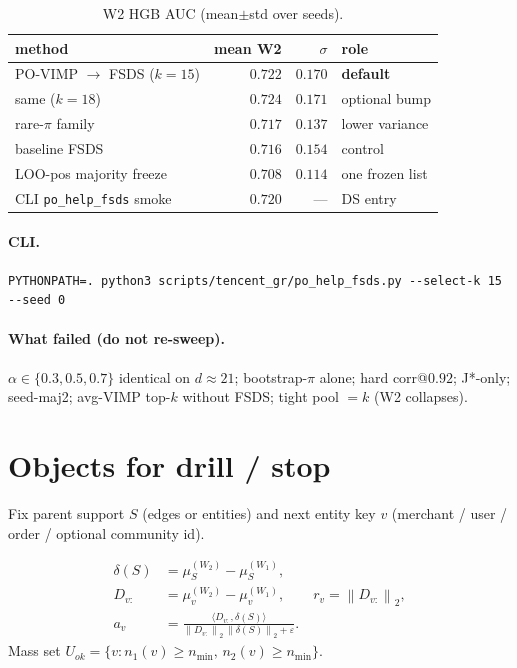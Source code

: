 \documentclass[11pt]{article}
\newcommand{\norm}[1]{\left\|#1\right\|_2}
\begin{document}
\begin{table}[h]
\centering
\caption{W2 HGB AUC (mean$\pm$std over seeds).}
\label{tab:fsds-head}
\begin{tabular}{lrrl}
\toprule
method & mean W2 & $\sigma$ & role \\
\midrule
PO-VIMP $\to$ FSDS ($k{=}15$) & $\mathbf{0.722}$ & $0.170$ & \textbf{default} \\
same ($k{=}18$) & $0.724$ & $0.171$ & optional bump \\
rare-$\pi$ family & $0.717$ & $\mathbf{0.137}$ & lower variance \\
baseline FSDS & $0.716$ & $0.154$ & control \\
LOO-pos majority freeze & $0.708$ & $0.114$ & one frozen list \\
CLI \texttt{po\_help\_fsds} smoke & $0.720$ & --- & DS entry \\
\bottomrule
\end{tabular}
\end{table}

\paragraph{CLI.}
\begin{verbatim}
PYTHONPATH=. python3 scripts/tencent_gr/po_help_fsds.py --select-k 15 --seed 0
\end{verbatim}

\paragraph{What failed (do not re-sweep).}
$\alpha\in\{0.3,0.5,0.7\}$ identical on $d\approx 21$;
bootstrap-$\pi$ alone; hard corr@$0.92$; J*-only; seed-maj2;
avg-VIMP top-$k$ without FSDS; tight pool $=k$ (W2 collapses).

\section{Objects for drill / stop}
\label{sec:objects}

Fix parent support $S$ (edges or entities) and next entity key
$v$ (merchant / user / order / optional community id).

\begin{align}
  \delta(S)
  &= \mu_S^{(W_2)}-\mu_S^{(W_1)},
  \label{eq:delta}\\
  D_{v:}
  &= \mu_v^{(W_2)}-\mu_v^{(W_1)},
  \qquad
  r_v=\norm{D_{v:}},
  \label{eq:r}\\
  a_v
  &= \frac{\langle D_{v:},\delta(S)\rangle}
          {\norm{D_{v:}}\,\norm{\delta(S)}+\varepsilon}.
  \label{eq:align}
\end{align}
Mass set $U_{ok}=\{v:n_1(v)\ge n_{\min},\,n_2(v)\ge n_{\min}\}$.
\end{document}
